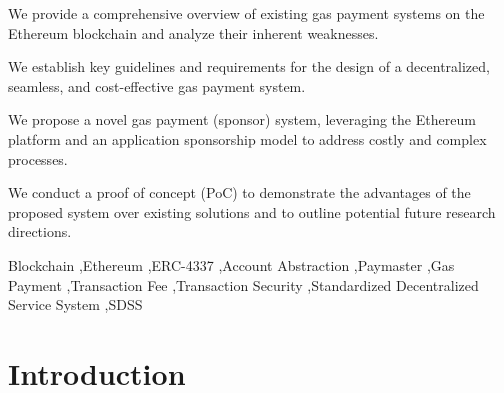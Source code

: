 \documentclass[preprint,12pt]{elsarticle}
\begin{document}
\begin{frontmatter}

\begin{highlights}
\item We provide a comprehensive overview of existing gas payment systems on the Ethereum blockchain and analyze their inherent weaknesses.
\item We establish key guidelines and requirements for the design of a decentralized, seamless, and cost-effective gas payment system.
\item We propose a novel gas payment (sponsor) system, leveraging the Ethereum platform and an application sponsorship model to address costly and complex processes.
\item We conduct a proof of concept (PoC) to demonstrate the advantages of the proposed system over existing solutions and to outline potential future research directions.
\end{highlights}

\begin{keyword}
Blockchain \sep Ethereum \sep ERC-4337 \sep Account Abstraction \sep Paymaster \sep Gas Payment \sep Transaction Fee \sep Transaction Security \sep Standardized Decentralized Service System \sep SDSS



\end{keyword}

\end{frontmatter}



\section{Introduction}
\label{sec:introduction}
\end{document}
